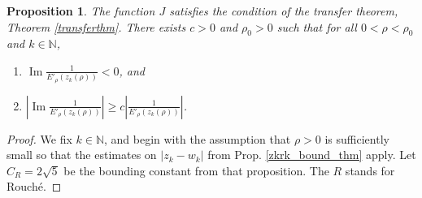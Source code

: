 \documentclass[10pt,a4paper]{amsart}
\newtheorem{prop}{Proposition}
\DeclareMathOperator{\Imz}{Im}
\newcommand{\N}{\mathbb{N}}
\begin{document}
\begin{prop}\label{jtransferthm}
The function $J$ satisfies the condition of the transfer theorem, Theorem \ref{transferthm}. There exists $c > 0$ and $\rho_0 > 0$ such that for all $0 < \rho < \rho_0$ and $k \in \N$,
\begin{enumerate}
    \item $\Imz \frac{1}{E'_\rho(z_k(\rho))} < 0$, and
    \item $\left| \Imz \frac{1}{E'_\rho(z_k(\rho))} \right| \geq c\left| \frac{1}{E'_\rho(z_k(\rho))} \right|$.
\end{enumerate}  
\end{prop}

\begin{proof}
 We fix $k \in \N$, and begin with the assumption that $\rho > 0$ is sufficiently small so that the estimates on $|z_k - w_k|$ from Prop. \ref{zkrk_bound_thm} apply. Let $C_R = 2\sqrt{5}$ be the bounding constant from that proposition. The $R$ stands for Rouch\'e.


\end{proof}
\end{document}

